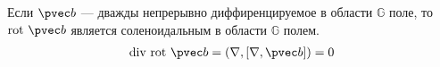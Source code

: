 \begin{example}
  Если $\pvec b$ --- дважды непрерывно диффиренцируемое в области $\mathbb{G}$
  поле, то $\mbox{rot} \ \pvec b$ является соленоидальным в области
  $\mathbb{G}$ полем.
  \begin{gather*}
    \mbox{div} \ \mbox{rot} \ \pvec b = (\nabla, [\nabla, \pvec b]) = 0
  \end{gather*}
\end{example}
